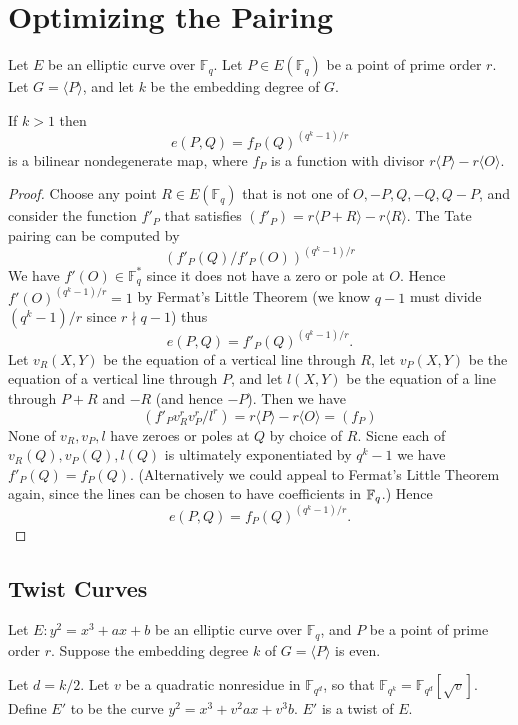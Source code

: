 \chapter{Optimizing the Pairing}

\begin{theorem}
Let $E$ be an elliptic curve over $\mathbb{F}_q$.
Let $P \in E(\mathbb{F}_q)$ be a point of prime order $r$.
Let $G = \langle P \rangle$, and let $k$ be the embedding degree of $G$.

If $k > 1$ then
\[
e(P,Q) = f_P(Q)^{(q^k-1)/r}
\]
is a bilinear nondegenerate map,
where $f_P$ is a function with divisor $r\langle P\rangle - r\langle O\rangle$.
\end{theorem}

\begin{proof}
Choose any point $R \in E(\mathbb{F}_q)$ that is not one of
$O, -P, Q, -Q, Q - P$,
and consider the function $f'_P$ that satisfies $(f'_P) = r\langle P+R\rangle
- r\langle R \rangle$.
The Tate pairing can be computed by
\[
(f'_P(Q)/f'_P(O))^{(q^k-1)/r}
\]
We have $f'(O) \in \mathbb{F}_q^*$ since it does not have a zero or pole
at $O$. Hence
$f'(O)^{(q^k-1)/r} = 1$ by Fermat's Little Theorem (we know $q-1$ must
divide $(q^k - 1)/r$ since $r\nmid q-1$) thus
\[ e(P,Q) = f'_P(Q)^{(q^k-1)/r} . \]
Let $v_R(X,Y)$ be the equation of a vertical line through $R$,
let $v_P(X,Y)$ be the equation of a vertical line through $P$,
and let $l(X,Y)$ be the equation of a line through $P+R$ and $-R$ (and hence
$-P$).
Then we have
\[ (f'_P v_R^r v_P^r / l^r) = r \langle P \rangle - r \langle O \rangle
= (f_P) \]
None of $v_R, v_P, l$ have zeroes or poles at $Q$ by choice of $R$.
Sicne each of $v_R(Q), v_P(Q), l(Q)$ is ultimately exponentiated by $q^k-1$
we have $f'_P(Q) = f_P(Q)$.
(Alternatively we could appeal to Fermat's Little Theorem
again, since the lines can be chosen to have coefficients in $\mathbb{F}_q$.)
Hence
\[e(P,Q) = f_P(Q)^{(q^k-1)/r} . \]
\end{proof}

\section {Twist Curves}

Let $E : y^2 = x^3 + a x + b$ be an elliptic curve over $\mathbb{F}_q$,
and $P$ be a point of prime order $r$.
Suppose the embedding degree $k$ of $G = \langle P \rangle$ is even.

Let $d = k / 2$. Let $v$ be a quadratic nonresidue in $\mathbb{F}_{q^d}$,
so that $\mathbb{F}_{q^k} = \mathbb{F}_{q^d}[\sqrt{v}]$.
Define $E'$ to be the curve $y^2 = x^3 + v^2 a x + v^3 b$. $E'$ is a twist
of $E$.

